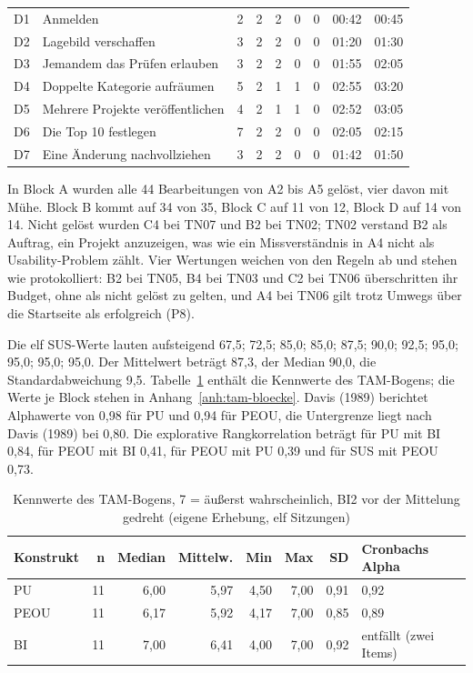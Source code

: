 \begin{table}[htbp]
\begin{tabular}{@{}L{0.8cm}L{5.4cm}rrrrrrr@{}}
	D1 & Anmelden & 2 & 2 & 2 & 0 & 0 & 00:42 & 00:45 \\
	D2 & Lagebild verschaffen & 3 & 2 & 2 & 0 & 0 & 01:20 & 01:30 \\
	D3 & Jemandem das Prüfen erlauben & 3 & 2 & 2 & 0 & 0 & 01:55 & 02:05 \\
	D4 & Doppelte Kategorie aufräumen & 5 & 2 & 1 & 1 & 0 & 02:55 & 03:20 \\
	D5 & Mehrere Projekte veröffentlichen & 4 & 2 & 1 & 1 & 0 & 02:52 & 03:05 \\
	D6 & Die Top 10 festlegen & 7 & 2 & 2 & 0 & 0 & 02:05 & 02:15 \\
	D7 & Eine Änderung nachvollziehen & 3 & 2 & 2 & 0 & 0 & 01:42 & 01:50 \\
	\bottomrule
	\end{tabular}
\end{table}

In Block A wurden alle 44 Bearbeitungen von A2 bis A5 gelöst, vier davon mit Mühe. Block B kommt auf 34 von 35, Block C auf 11 von 12, Block D auf 14 von 14. Nicht gelöst wurden C4 bei TN07 und B2 bei TN02; TN02 verstand B2 als Auftrag, ein Projekt anzuzeigen, was wie ein Missverständnis in A4 nicht als Usability-Problem zählt. Vier Wertungen weichen von den Regeln ab und stehen wie protokolliert: B2 bei TN05, B4 bei TN03 und C2 bei TN06 überschritten ihr Budget, ohne als nicht gelöst zu gelten, und A4 bei TN06 gilt trotz Umwegs über die Startseite als erfolgreich (P8).

Die elf SUS-Werte lauten aufsteigend 67,5; 72,5; 85,0; 85,0; 87,5; 90,0; 92,5; 95,0; 95,0; 95,0; 95,0. Der Mittelwert beträgt 87,3, der Median 90,0, die Standardabweichung 9,5. Tabelle~\ref{tab:tam} enthält die Kennwerte des TAM-Bogens; die Werte je Block stehen in Anhang~\ref{anh:tam-bloecke}. Davis (1989) berichtet Alphawerte von 0,98 für PU und 0,94 für PEOU, die Untergrenze liegt nach Davis (1989) bei 0,80. Die explorative Rangkorrelation beträgt für PU mit BI 0,84, für PEOU mit BI 0,41, für PEOU mit PU 0,39 und für SUS mit PEOU 0,73.

\begin{table}[htbp]
	\centering
	\footnotesize
	\caption[Kennwerte des TAM-Bogens]{Kennwerte des TAM-Bogens, 7 = äußerst wahrscheinlich, BI2 vor der Mittelung gedreht (eigene Erhebung, elf Sitzungen)}
	\label{tab:tam}
	\begin{tabular}{@{}lrrrrrrl@{}}
		\toprule
		\textbf{Konstrukt} & \textbf{n} & \textbf{Median} & \textbf{Mittelw.} & \textbf{Min} & \textbf{Max} & \textbf{SD} & \textbf{Cronbachs Alpha} \\
		\midrule
		PU & 11 & 6,00 & 5,97 & 4,50 & 7,00 & 0,91 & 0,92 \\
		PEOU & 11 & 6,17 & 5,92 & 4,17 & 7,00 & 0,85 & 0,89 \\
		BI & 11 & 7,00 & 6,41 & 4,00 & 7,00 & 0,92 & entfällt (zwei Items) \\
		\bottomrule
	\end{tabular}
\end{table}

